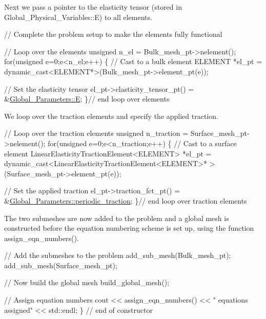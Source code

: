 Next we pass a pointer to the elasticity tensor (stored in {\ttfamily Global\+\_\+\+Physical\+\_\+\+Variables\+::E}) to all elements.


\begin{DoxyCodeInclude}
 \textcolor{comment}{// Complete the problem setup to make the elements fully functional}

 \textcolor{comment}{// Loop over the elements}
 \textcolor{keywordtype}{unsigned} n\_el = Bulk\_mesh\_pt->nelement();
 \textcolor{keywordflow}{for}(\textcolor{keywordtype}{unsigned} e=0;e<n\_el;e++)
  \{
   \textcolor{comment}{// Cast to a bulk element}
   ELEMENT *el\_pt = \textcolor{keyword}{dynamic\_cast<}ELEMENT*\textcolor{keyword}{>}(Bulk\_mesh\_pt->element\_pt(e));

   \textcolor{comment}{// Set the elasticity tensor}
   el\_pt->elasticity\_tensor\_pt() = &\hyperlink{namespaceGlobal__Parameters_a397f48e074d2589259ed5c6e4d89f948}{Global\_Parameters::E};
  \}\textcolor{comment}{// end loop over elements}

\end{DoxyCodeInclude}


We loop over the traction elements and specify the applied traction.


\begin{DoxyCodeInclude}
 \textcolor{comment}{// Loop over the traction elements}
 \textcolor{keywordtype}{unsigned} n\_traction =  Surface\_mesh\_pt->nelement();
 \textcolor{keywordflow}{for}(\textcolor{keywordtype}{unsigned} e=0;e<n\_traction;e++)
  \{
   \textcolor{comment}{// Cast to a surface element}
   LinearElasticityTractionElement<ELEMENT> *el\_pt = 
    \textcolor{keyword}{dynamic\_cast<}LinearElasticityTractionElement<ELEMENT>* \textcolor{keyword}{>}
    (Surface\_mesh\_pt->element\_pt(e));
   
   \textcolor{comment}{// Set the applied traction}
   el\_pt->traction\_fct\_pt() = &\hyperlink{namespaceGlobal__Parameters_a003c4c942a4c8b88b417f139fc5c637c}{Global\_Parameters::periodic\_traction};
  \}\textcolor{comment}{// end loop over traction elements}

\end{DoxyCodeInclude}


The two submeshes are now added to the problem and a global mesh is constructed before the equation numbering scheme is set up, using the function {\ttfamily assign\+\_\+eqn\+\_\+numbers()}.


\begin{DoxyCodeInclude}
 \textcolor{comment}{// Add the submeshes to the problem}
 add\_sub\_mesh(Bulk\_mesh\_pt);
 add\_sub\_mesh(Surface\_mesh\_pt);

 \textcolor{comment}{// Now build the global mesh}
 build\_global\_mesh();

 \textcolor{comment}{// Assign equation numbers}
 cout << assign\_eqn\_numbers() << \textcolor{stringliteral}{" equations assigned"} << std::endl; 
\} \textcolor{comment}{// end of constructor}

\end{DoxyCodeInclude}





